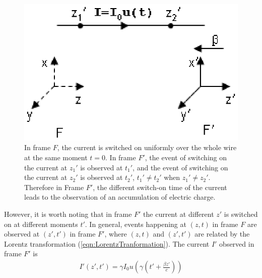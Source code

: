 \documentclass[prd,showpacs,twocolumn]{revtex4-1}
\begin{document}
\begin{figure}
\center
\includegraphics{SwitchOn.eps}
\caption{In frame $F$, the current is switched on uniformly over the whole wire at the same moment $t=0$. In frame $F'$, the event of switching on the current at $z_1'$ is observed at $t_1'$, and the event of switching on the current at $z_2'$ is observed at $t_2'$, $t_1'\ne t_2'$ when $z_1'\ne z_2'$. Therefore in Frame $F'$, the different switch-on time of the current leads to the observation of an accumulation of electric charge.}
\label{fig:SwitchOn}
\end{figure}

However, it is worth noting that in frame $F'$ the current at different $z'$ is switched on at different moments $t'$. In general, events happening at $(z, t)$ in frame $F$ are observed at $(z', t')$ in frame $F'$, where $(z, t)$ and $(z', t')$ are related by the Lorentz transformation (\ref{eqn:LorentzTranformation}). The current $I'$ observed in frame $F'$ is
\begin{eqnarray}
I'(z',t')=\gamma I_0u(\gamma(t'+\frac{\beta z'}{c}))
\label{eqn:IP}
\end{eqnarray}
\end{document}
